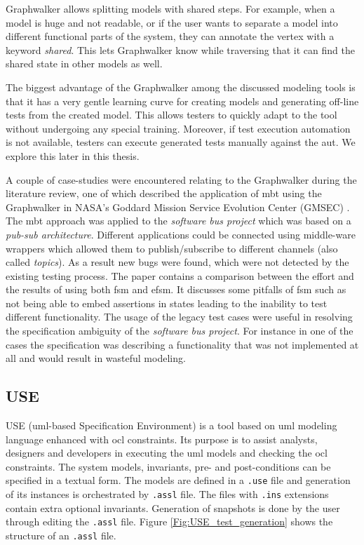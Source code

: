 \par
Graphwalker allows splitting models with shared steps. For example, when a model is huge and not readable, or if the user wants to separate a model into different functional parts of the system, they can annotate the vertex with a keyword \textit{shared}. This lets Graphwalker know while traversing that it can find the shared state in other models as well.

\par
The biggest advantage of the Graphwalker among the discussed modeling tools is that it has a very gentle learning curve for creating models and generating off-line tests from the created model. This allows testers to quickly adapt to the tool without undergoing any special training. Moreover, if test execution automation is not available, testers can execute generated tests manually against the \acrshort{aut}. We explore this later in this thesis.

\par
A couple of case-studies were encountered relating to the Graphwalker during the literature review, one of which described the application of \acrshort{mbt} using the Graphwalker in NASA's Goddard Mission Service Evolution Center (GMSEC) \cite{GMSEC}. The \acrshort{mbt} approach was applied to the \textit{software bus project} which was based on a \textit{pub-sub architecture}. Different applications could be connected using middle-ware wrappers which allowed them to publish/subscribe to different channels (also called \textit{topics}). As a result new bugs were found, which were not detected by the existing testing process. The paper contains a comparison between the effort and the results of using both \acrshort{fsm} and \acrshort{efsm}. It discusses some pitfalls of \acrshort{fsm} such as not being able to embed assertions in states leading to the inability to test different functionality. The usage of the legacy test cases were useful in resolving the specification ambiguity of the \textit{software bus project}. For instance in one of the cases the specification was describing a functionality that was not implemented at all and would result in wasteful modeling.

\subsection{USE}
\par
USE (\acrshort{uml}-based Specification Environment)  is a tool based on \acrshort{uml} modeling language enhanced with \acrshort{ocl} constraints. Its purpose is to assist analysts, designers and developers in executing the \acrshort{uml} models and checking the \acrshort{ocl} constraints. The system models, invariants,  pre- and post-conditions can be specified in a textual form. The models are defined in a \texttt{.use} file and generation of its instances is orchestrated by \texttt{.assl} file. The files with \texttt{.ins} extensions contain extra optional invariants. Generation of snapshots is done by the user through editing the \texttt{.assl} file. Figure \ref{Fig:USE_test_generation} shows the structure of an \texttt{.assl} file.


